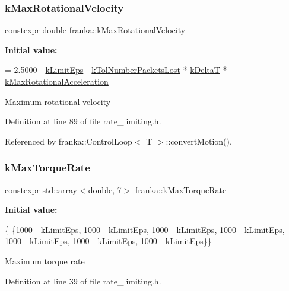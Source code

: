 \subsubsection{\texorpdfstring{k\+Max\+Rotational\+Velocity}{kMaxRotationalVelocity}}
{\footnotesize\ttfamily constexpr double franka\+::k\+Max\+Rotational\+Velocity}

{\bfseries Initial value\+:}
\begin{DoxyCode}
=
    2.5000 - \hyperlink{namespacefranka_aad1f9b575274830b8da9e638559d424b}{kLimitEps} - \hyperlink{namespacefranka_a664b546834ceecd4e3220ffa92f1172c}{kTolNumberPacketsLost} * 
      \hyperlink{namespacefranka_a1e207a0d5a6e90c1e1a78e6e1057120a}{kDeltaT} * \hyperlink{namespacefranka_a5e3d5c95ba72f9660f17f8ebf1e0aa2e}{kMaxRotationalAcceleration}
\end{DoxyCode}
Maximum rotational velocity 

Definition at line 89 of file rate\+\_\+limiting.\+h.



Referenced by franka\+::\+Control\+Loop$<$ T $>$\+::convert\+Motion().

\mbox{\label{namespacefranka_a6c1a0e9a5e1f375d2aad61edac907d4e}} 
\subsubsection{\texorpdfstring{k\+Max\+Torque\+Rate}{kMaxTorqueRate}}
{\footnotesize\ttfamily constexpr std\+::array$<$double, 7$>$ franka\+::k\+Max\+Torque\+Rate}

{\bfseries Initial value\+:}
\begin{DoxyCode}
\{
    \{1000 - \hyperlink{namespacefranka_aad1f9b575274830b8da9e638559d424b}{kLimitEps}, 1000 - \hyperlink{namespacefranka_aad1f9b575274830b8da9e638559d424b}{kLimitEps}, 1000 - \hyperlink{namespacefranka_aad1f9b575274830b8da9e638559d424b}{kLimitEps}, 1000 - 
      \hyperlink{namespacefranka_aad1f9b575274830b8da9e638559d424b}{kLimitEps}, 1000 - \hyperlink{namespacefranka_aad1f9b575274830b8da9e638559d424b}{kLimitEps},
     1000 - \hyperlink{namespacefranka_aad1f9b575274830b8da9e638559d424b}{kLimitEps}, 1000 - kLimitEps\}\}
\end{DoxyCode}
Maximum torque rate 

Definition at line 39 of file rate\+\_\+limiting.\+h.



